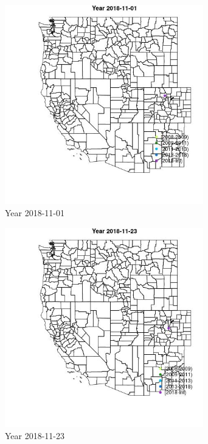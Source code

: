 \begin{figure} 
\centering  
\includegraphics[width=0.77\textwidth]{Code_Outputs/Report_ML_input_PM25_Step4_part_e_de_duplicated_aves_MapObsYear2018-11-01.jpg} 
\caption{\label{fig:Report_ML_input_PM25_Step4_part_e_de_duplicated_avesMapObsYear2018-11-01}Year 2018-11-01} 
\end{figure} 
 

\begin{figure} 
\centering  
\includegraphics[width=0.77\textwidth]{Code_Outputs/Report_ML_input_PM25_Step4_part_e_de_duplicated_aves_MapObsYear2018-11-23.jpg} 
\caption{\label{fig:Report_ML_input_PM25_Step4_part_e_de_duplicated_avesMapObsYear2018-11-23}Year 2018-11-23} 
\end{figure} 
 

